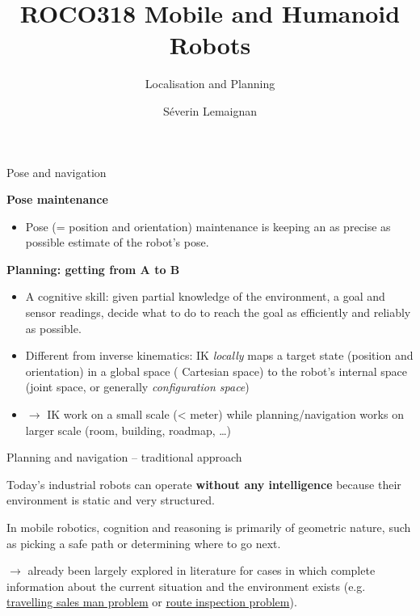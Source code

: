 \documentclass[compress,xcolor=table]{beamer}
\title{ROCO318 \newline Mobile and Humanoid Robots}
\subtitle{Localisation and Planning}
\date{}
\author{Séverin Lemaignan}
\institute{Centre for Neural Systems and Robotics\\{\bf Plymouth University}}
\begin{document}

\maketitle

\begin{frame}{Pose and navigation}

    \textbf{Pose maintenance}

    \begin{itemize}
        \item Pose (= position and orientation) maintenance is
            keeping an as precise as possible estimate of the robot's pose.
    \end{itemize}

    \pause

    \textbf{Planning: getting from A to B}

    \begin{itemize}
        \item A cognitive skill: given partial knowledge of the environment, a
            goal and sensor readings, decide what to do to reach the goal as
            efficiently and reliably as possible.

        \item Different from inverse kinematics: IK \emph{locally} maps a
            target state (position and orientation) in a global space (\eg
            Cartesian space) to the robot's internal space (joint space, or
            generally \emph{configuration space})

        \item $\rightarrow$ IK work on a small scale (\textless{} meter) while
            planning/navigation works on larger scale (room, building, roadmap,
            \ldots{})

    \end{itemize}

\end{frame}

\begin{frame}{Planning and navigation -- traditional approach}

    Today's industrial robots can operate \textbf{without any intelligence} because
    their environment is static and very structured.

    In mobile robotics, cognition and reasoning is primarily of geometric
    nature, such as picking a safe path or determining where to go next.

    $\rightarrow$ already been largely explored in literature for cases in
    which complete information about the current situation and the environment
    exists (e.g.
    \href{http://en.wikipedia.org/wiki/Travelling_salesman_problem}{travelling
    sales man problem} or
    \href{http://en.wikipedia.org/wiki/Route_inspection_problem}{route
    inspection problem}).

\end{frame}
\end{document}
